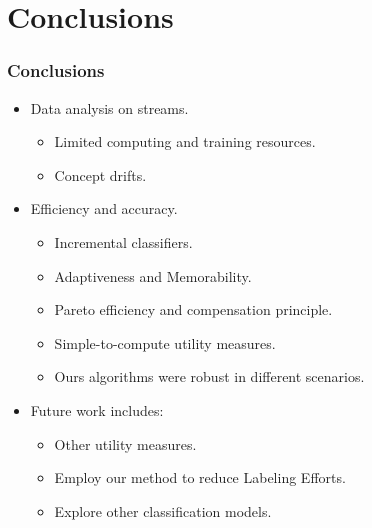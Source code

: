 \documentclass[14pt]{beamer}
\begin{document}




\section{Conclusions}

\begin{frame}\frametitle{Conclusions}
\begin{itemize}
\item Data analysis on streams.
\begin{itemize}
\item Limited computing and training resources.
\item Concept drifts.
\end{itemize}
\pause
\item Efficiency and accuracy.
\begin{itemize}
\item Incremental classifiers.
\item Adaptiveness and Memorability.
\item Pareto efficiency and compensation principle.
\item Simple-to-compute utility measures.
\item Ours algorithms were robust in different scenarios.
\end{itemize}
\pause
\item Future work includes:
\begin{itemize}
\item Other utility measures.
\item Employ our method to reduce Labeling Efforts.
\item Explore other classification models.
\end{itemize}
\end{itemize}

\end{frame}
\end{document}
